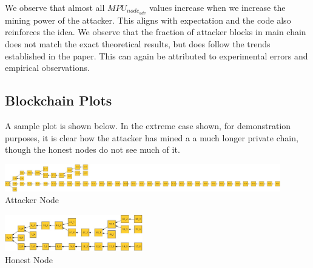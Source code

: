 \documentclass[a4paper,14pt]{article}
\begin{document}
We observe that almost all $MPU_{node_{adv}}$ values increase when we increase the mining power of the attacker. This aligns with expectation and the code also reinforces the idea. We observe that the fraction of attacker blocks in main chain does not match the exact theoretical results, but does follow the trends established in the paper. This can again be attributed to experimental errors and empirical observations.

\subsection{Blockchain Plots}

A sample plot is shown below. In the extreme case shown, for demonstration purposes, it is clear how the attacker has mined a a much longer private chain, though the honest nodes do not see much of it.

\begin{center}
    \includegraphics[width=12cm]{attacker.jpeg}\\
    Attacker Node
\end{center}


\begin{center}
    \includegraphics[width=6cm]{normal.jpeg}\\
    Honest Node
\end{center}
\end{document}
